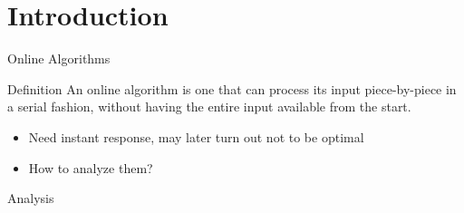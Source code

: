 \section{Introduction}
    
    \begin{frame}{Online Algorithms}
        
        	\begin{block}{Definition}
			An online algorithm is one that can process its input piece-by-piece in a serial fashion, without having the entire input available from the start. 
			\end{block}
        
        \vspace{8pt}
        \begin{itemize}
        	\item Need instant response, may later turn out not to be optimal
        	\item How to analyze them?
        	
        \end{itemize}
    \end{frame}
    
    \begin{frame}{Analysis}
    \end{frame}
    
